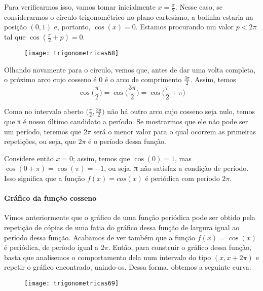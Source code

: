 Para verificarmos isso, vamos tomar inicialmente $x=\frac{\pi}{2}$. Nesse caso, se considerarmos o círculo trigonométrico no plano cartesiano, a bolinha estaria na posição $(0,1)$ e, portanto, $\cos(x)=0$. Estamos procurando um valor $p<2\pi$ tal que $\cos(\frac{\pi}{2}+p)=0$.

\begin{figure}[H]
\centering

\texttt{[image: trigonometricas68]}
\end{figure}

Olhando novamente para o círculo, vemos que, antes de dar uma volta completa, o próximo arco cujo cosseno é $0$ é o arco de comprimento $\frac{3\pi}{2}$. Assim, temos
\begin{equation*}
\cos\bigg(\frac{\pi}{2}\bigg)=\cos\bigg(\frac{3\pi}{2}\bigg)=\cos\bigg(\frac{\pi}{2}+\pi\bigg)  
\end{equation*}

Como no intervalo aberto $\big(\frac{\pi}{2},\frac{3\pi}{2}\big)$ não há outro arco cujo cosseno seja nulo, temos que π é nosso último candidato a período. Se mostrarmos que ele não pode ser um período, teremos que $2\pi$ será o menor valor para o qual ocorrem as primeiras repetições, ou seja, que $2\pi$ é o período dessa função.

Considere então $x=0$; assim, temos que $\cos(0)=1$, mas $\cos(0+\pi)=\cos(\pi)=-1$, ou seja, π não satisfaz a condição de período. Isso significa que a função $f(x)=cos(x)$ é periódica com período $2\pi$.

\ifnum{}
\clearpage
\else
\fi
\paragraph{Gráfico da função cosseno}

Vimos anteriormente que o gráfico de uma função periódica pode ser obtido pela repetição de cópias de uma fatia do gráfico dessa função de largura igual ao período dessa função. Acabamos de ver também que a função $f(x)=\cos(x)$ é periódica, de período igual a $2\pi$. Então, para construir o gráfico dessa função, basta que analisemos o comportamento dela num intervalo do tipo $(x,x+2\pi)$ e repetir o gráfico encontrado, unindo-os. Dessa forma, obtemos a seguinte curva:

\begin{figure}[H]
\centering

\texttt{[image: trigonometricas69]}
\end{figure}

